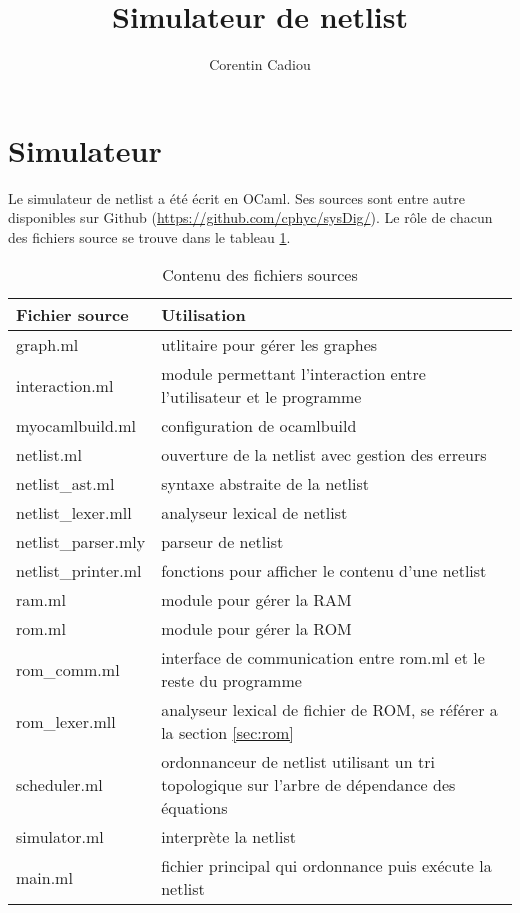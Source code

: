 \documentclass{article}
\title{Simulateur de netlist}
\author{Corentin Cadiou}
\begin{document}
  \maketitle
\section{Simulateur}
\label{sec:simulateur}

Le simulateur de netlist a été écrit en OCaml. Ses sources sont entre
autre disponibles sur Github
(\url{https://github.com/cphyc/sysDig/}). Le rôle de chacun des
fichiers source se trouve dans le tableau \ref{tab:1}.
\begin{table}
  \noindent\begin{tabular}{|l|p{}|}
    \hline
    \textbf{Fichier source} & \textbf{Utilisation} \\
    \hline
    graph.ml & utlitaire pour gérer les graphes\\
    interaction.ml & module permettant l'interaction entre l'utilisateur et le programme \\
    myocamlbuild.ml & configuration de ocamlbuild \\
    netlist.ml & ouverture de la netlist avec gestion des erreurs \\
    netlist\_ast.ml & syntaxe abstraite de la netlist \\
    netlist\_lexer.mll & analyseur lexical de netlist \\
    netlist\_parser.mly & parseur de netlist \\
    netlist\_printer.ml & fonctions pour afficher le contenu d'une
    netlist \\
    ram.ml & module pour gérer la RAM \\
    rom.ml & module pour gérer la ROM \\
    rom\_comm.ml & interface de communication entre rom.ml et le reste du
    programme \\
    rom\_lexer.mll & analyseur lexical de fichier de ROM, se référer a la
    section \ref{sec:rom} \\
    scheduler.ml & ordonnanceur de netlist utilisant un tri topologique
    sur l'arbre de dépendance des équations \\
    simulator.ml & interprète la netlist \\
    main.ml & fichier principal qui ordonnance puis exécute la netlist\\
    \hline
  \end{tabular}
  \caption{\label{tab:1}Contenu des fichiers sources}
\end{table}
\end{document}
